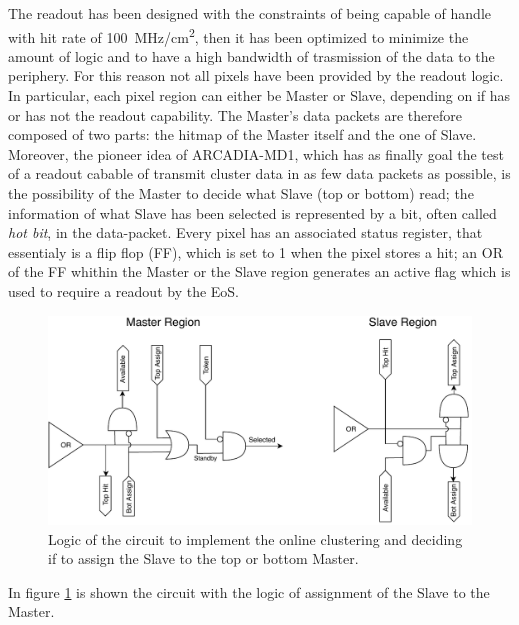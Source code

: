         The readout has been designed with the constraints of being capable of handle with hit rate of \SI{100}{MHz/cm\squared}, then it has been optimized to minimize the amount of logic and to have a high bandwidth of trasmission of the data to the periphery. For this reason not all pixels have been provided by the readout logic.
        In particular, each pixel region can either be Master or Slave, depending on if has or has not the readout capability. 
        The Master's data packets are therefore composed of two parts: the hitmap of the Master itself and the one of Slave. 
        Moreover, the pioneer idea of ARCADIA-MD1, which has as finally goal the test of a readout cabable of transmit cluster data in as few data packets as possible, is the possibility of the Master to decide what Slave (top or bottom) read; the information of what Slave has been selected is represented by a bit, often called \emph{hot bit}, in the data-packet.
        Every pixel has an associated status register, that essentialy is a flip flop (FF), which is set to 1 when the pixel stores a hit; an OR of the FF whithin the Master or the Slave region generates an active flag which is used to require a readout by the EoS.  
        \begin{figure}[h!]
            \centering
            \includegraphics[width=.95\linewidth]{figures/ARCADIA/clustering_logic.pdf}
            \caption{Logic of the circuit to implement the online clustering and deciding if to assign the Slave to the top or bottom Master.}
            \label{fig:clustering_logic}
        \end{figure}
        In figure \ref{fig:clustering_logic} is shown the circuit with the logic of assignment of the Slave to the Master.
        

